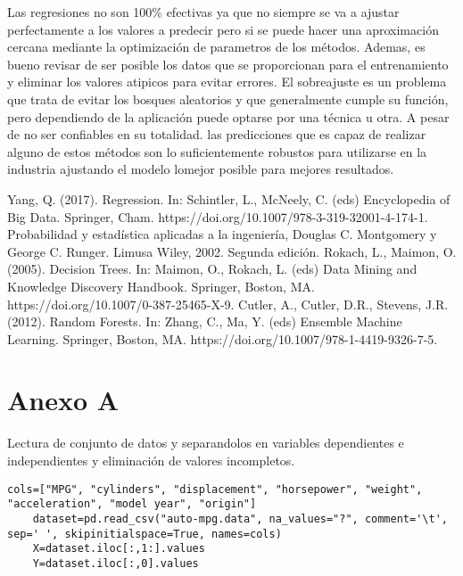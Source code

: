 \documentclass[conference]{IEEEtran}
\begin{document}
Las regresiones no son 100\% efectivas ya que no siempre se va a ajustar perfectamente a los valores a predecir pero si se puede hacer una aproximación cercana mediante la optimización de parametros de los métodos. Ademas, es bueno revisar de ser posible los datos que se proporcionan para el entrenamiento y eliminar los valores atipicos para evitar errores. El sobreajuste es un problema que trata de evitar los bosques aleatorios y que generalmente cumple su función, pero dependiendo de la aplicación puede optarse por una técnica u otra. A pesar de no ser confiables en su totalidad. las predicciones que es capaz de realizar alguno de estos métodos son lo suficientemente robustos para utilizarse en la industria ajustando el modelo lomejor posible para mejores resultados. 


\begin{thebibliography}{00}
Yang, Q. (2017). Regression. In: Schintler, L., McNeely, C. (eds) Encyclopedia of Big Data. Springer, Cham. https://doi.org/10.1007/978-3-319-32001-4-174-1.
 Probabilidad y estadística aplicadas a la ingeniería, Douglas C. Montgomery y George C. Runger. Limusa Wiley, 2002. Segunda edición.
 Rokach, L., Maimon, O. (2005). Decision Trees. In: Maimon, O., Rokach, L. (eds) Data Mining and Knowledge Discovery Handbook. Springer, Boston, MA. https://doi.org/10.1007/0-387-25465-X-9.
 Cutler, A., Cutler, D.R., Stevens, J.R. (2012). Random Forests. In: Zhang, C., Ma, Y. (eds) Ensemble Machine Learning. Springer, Boston, MA. https://doi.org/10.1007/978-1-4419-9326-7-5.

\end{thebibliography}

\section{Anexo A}
Lectura de conjunto de datos y separandolos en variables dependientes e independientes y eliminación de valores incompletos.  
\lstset{language=Python, breaklines=true, basicstyle=\footnotesize}
\lstset{numbers=left, numberstyle=\tiny, stepnumber=1, numbersep=-2pt}
\begin{lstlisting}[frame=single]
    cols=["MPG", "cylinders", "displacement", "horsepower", "weight", "acceleration", "model year", "origin"]
    dataset=pd.read_csv("auto-mpg.data", na_values="?", comment='\t', sep=' ', skipinitialspace=True, names=cols)
    X=dataset.iloc[:,1:].values
    Y=dataset.iloc[:,0].values
\end{lstlisting}
\end{document}
